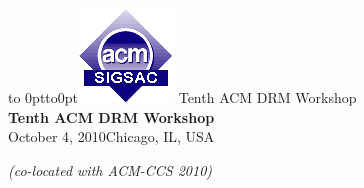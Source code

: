 \documentclass{article}
\begin{document}
\begin{center}
\vbox to 0pt{\hbox to0pt{\hskip10pt\includegraphics[width=.12\hsize]{sigsac.png}\hss}\vss}
  \textcolor[rgb]{.5,.5,.5}{\Huge Tenth ACM DRM Workshop}\\[-2mm]
  {\LARGE\bfseries \textcolor[rgb]{0,.08,.4}{Tenth ACM DRM Workshop~~}}\\[2mm]
  October 4, 2010\qquad{\tiny$^\bullet$}\qquad Chicago, IL, USA
\end{center}
\begin{flushright}
  \textit{(co-located with ACM-CCS 2010)}
\end{flushright}\par\smallskip
\end{document}
